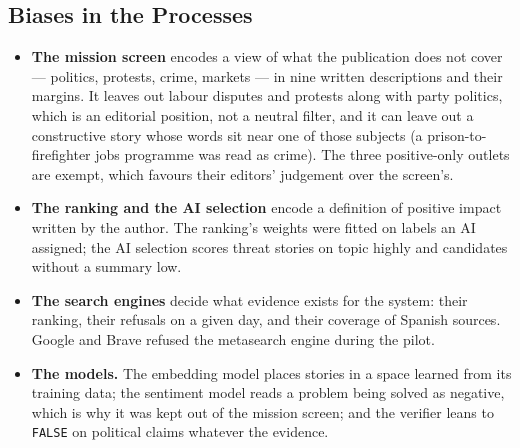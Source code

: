 
\subsection{Biases in the Processes}

\begin{itemize}
    \item \textbf{The mission screen} encodes a view of what the
    publication does not cover --- politics, protests, crime, markets ---
    in nine written descriptions and their margins. It leaves out labour
    disputes and protests along with party politics, which is an
    editorial position, not a neutral filter, and it can leave out a
    constructive story whose words sit near one of those subjects (a
    prison-to-firefighter jobs programme was read as crime). The three
    positive-only outlets are exempt, which favours their editors'
    judgement over the screen's.
    \item \textbf{The ranking and the AI selection} encode a definition
    of positive impact written by the author. The ranking's weights were
    fitted on labels an AI assigned; the AI selection scores threat
    stories on topic highly and candidates without a summary low.
    \item \textbf{The search engines} decide what evidence exists for
    the system: their ranking, their refusals on a given day, and their
    coverage of Spanish sources. Google and Brave refused the
    metasearch engine during the pilot.
    \item \textbf{The models.} The embedding model places stories in a
    space learned from its training data; the sentiment model reads a
    problem being solved as negative, which is why it was kept out of
    the mission screen; and the verifier leans to \texttt{FALSE} on
    political claims whatever the evidence.
\end{itemize}
